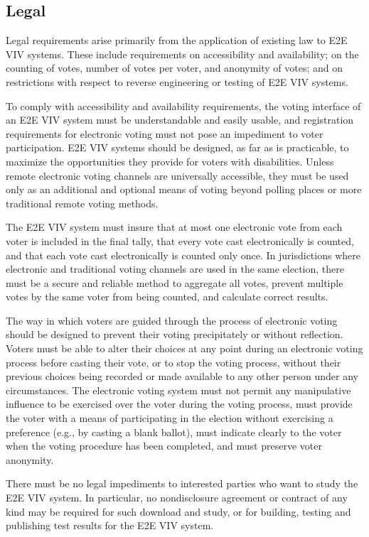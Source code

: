 \subsection{Legal}

Legal requirements arise primarily from the application of existing
law to E2E VIV systems. These include requirements on accessibility
and availability; on the counting of votes, number of votes per voter,
and anonymity of votes; and on restrictions with respect to reverse
engineering or testing of E2E VIV systems.

To comply with accessibility and availability requirements, the voting
interface of an E2E VIV system must be understandable and easily
usable, and registration requirements for electronic voting must not
pose an impediment to voter participation. E2E VIV systems should be
designed, as far as is practicable, to maximize the opportunities they
provide for voters with disabilities. Unless remote electronic voting
channels are universally accessible, they must be used only as an
additional and optional means of voting beyond polling places or more
traditional remote voting methods.

The E2E VIV system must insure that at most one electronic vote from
each voter is included in the final tally, that every vote cast
electronically is counted, and that each vote cast electronically is
counted only once. In jurisdictions where electronic and traditional
voting channels are used in the same election, there must be a secure
and reliable method to aggregate all votes, prevent multiple votes by
the same voter from being counted, and calculate correct results.

The way in which voters are guided through the process of electronic
voting should be designed to prevent their voting precipitately or
without reflection. Voters must be able to alter their choices at any
point during an electronic voting process before casting their vote,
or to stop the voting process, without their previous choices being
recorded or made available to any other person under any
circumstances. The electronic voting system must not permit any
manipulative influence to be exercised over the voter during the
voting process, must provide the voter with a means of participating
in the election without exercising a preference (e.g., by casting a
blank ballot), must indicate clearly to the voter when the voting
procedure has been completed, and must preserve voter anonymity.

There must be no legal impediments to interested parties who want to
study the E2E VIV system. In particular, no nondisclosure agreement or
contract of any kind may be required for such download and study, or
for building, testing and publishing test results for the E2E VIV
system.

